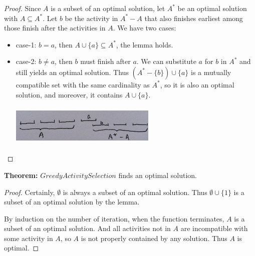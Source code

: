 \documentclass[11pt]{article}
\begin{document}
\begin{proof}
  Since $A$ is a subset of an optimal solution, let $A^*$ be an
  optimal solution with $A \subseteq A^*$. Let $b$ be the activity in
  $A^* - A$  that also finishes earliest among those finish after the
  activities in $A$. We have two cases:
\begin{itemize}
\item case-1: $b = a$, then $A \cup \{a\} \subseteq A^*$, the lemma
  holds. 
\item case-2: $b \neq a$, then $b$ must finish after $a$. We can
  substitute $a$ for $b$ in $A^*$ and still yields an optimal
  solution. Thus $(A^* - \{b\}) \cup \{a\}$ is a mutually compatible
  set with the same cardinality as $A^*$, so it is also an optimal
  solution, and moreover, it contains $A \cup \{a\}$.
  
  \includegraphics[width=7cm,height=2cm]{./imgs/activity-selection.png}
  
\end{itemize}
\end{proof}

\textbf{Theorem:} $GreedyActivitySelection$ finds an optimal
solution. 

\begin{proof}
  Certainly, $\emptyset$ is always a subset of an optimal
  solution. Thus $\emptyset \cup \{1\}$ is a subset of an optimal
  solution by the lemma. 

  By induction on the number of iteration, when the function
  terminates, $A$ is a subset of an optimal solution. And all
  activities not in $A$ are incompatible with some activity in $A$, so
  $A$ is not properly contained by any solution. Thus $A$ is optimal. 
\end{proof}
\end{document}
